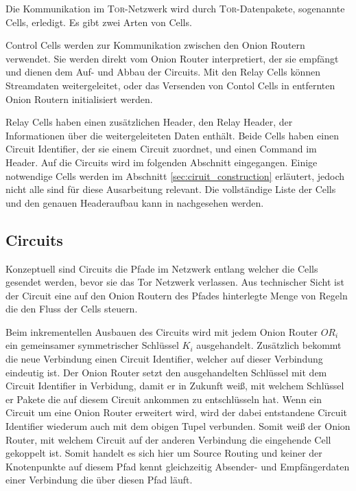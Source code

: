 \documentclass[fleqn,envcountsame,runningheads,10pt,a4paper]{llncs}
\begin{document}
Die Kommunikation im \textsc{Tor}-Netzwerk wird durch \textsc{Tor}-Datenpakete, sogenannte Cells, erledigt. Es gibt zwei Arten von Cells. 

Control Cells werden zur Kommunikation zwischen den Onion Routern verwendet. Sie werden direkt vom Onion Router interpretiert, der sie empfängt und dienen dem Auf- und Abbau der Circuits. Mit den Relay Cells können Streamdaten weitergeleitet, oder das Versenden von Contol Cells in entfernten Onion Routern initialisiert werden.

Relay Cells haben einen zusätzlichen Header, den Relay Header, der Informationen über die weitergeleiteten Daten enthält. Beide Cells haben einen Circuit Identifier, der sie einem Circuit zuordnet, und einen Command im Header. Auf die Circuits wird im folgenden Abschnitt eingegangen. Einige notwendige Cells werden im Abschnitt \ref{sec:ciruit_construction} erläutert, jedoch nicht alle sind für diese Ausarbeitung relevant. Die vollständige Liste der Cells und den genauen Headeraufbau kann in \cite{tor} nachgesehen werden.

\subsection{Circuits}

Konzeptuell sind Circuits die Pfade im Netzwerk entlang welcher die Cells gesendet werden, bevor sie das Tor Netzwerk verlassen. Aus technischer Sicht ist der Circuit eine auf den Onion Routern des Pfades hinterlegte Menge von Regeln die den Fluss der Cells steuern.

Beim inkrementellen Ausbauen des Circuits wird mit jedem Onion Router $\textit{OR}_i$ ein gemeinsamer symmetrischer Schlüssel $\textit{K}_i$ ausgehandelt. Zusätzlich bekommt die neue Verbindung einen Circuit Identifier, welcher auf dieser Verbindung eindeutig ist. Der Onion Router setzt den ausgehandelten Schlüssel mit dem Circuit Identifier in Verbidung, damit er in Zukunft weiß, mit welchem Schlüssel er Pakete die auf diesem Circuit ankommen zu entschlüsseln hat. Wenn ein Circuit um eine Onion Router erweitert wird, wird der dabei entstandene Circuit Identifier wiederum auch mit dem obigen Tupel verbunden. Somit weiß der Onion Router, mit welchem Circuit auf der anderen Verbindung die eingehende Cell gekoppelt ist. Somit handelt es sich hier um Source Routing und keiner der Knotenpunkte auf diesem Pfad kennt gleichzeitig Absender- und Empfängerdaten einer Verbindung die über diesen Pfad läuft. 
\end{document}
